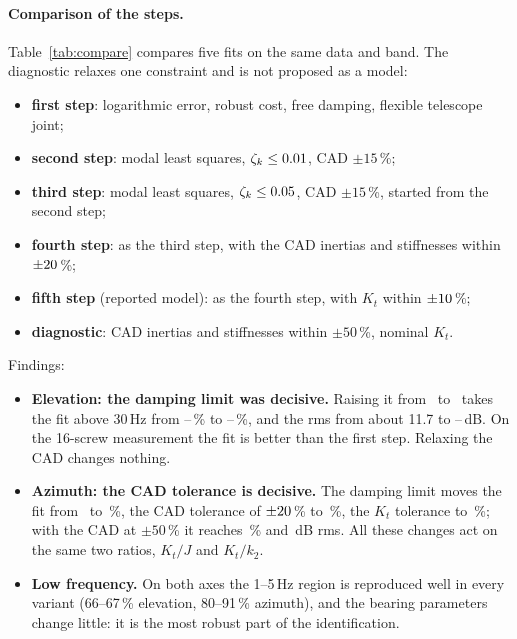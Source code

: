 \documentclass[10pt,a4paper]{article}
\numberwithin{equation}{section}
\begin{document}
\paragraph{Comparison of the steps.} Table~\ref{tab:compare} compares five fits on the same data and band. The diagnostic relaxes one constraint and is not proposed as a model:
\begin{itemize}
\item \textbf{first step}: logarithmic error, robust cost, free damping, flexible telescope joint;
\item \textbf{second step}: modal least squares, $\zeta_k\leq0.01$, CAD $\pm15$\,\%;
\item \textbf{third step}: modal least squares, $\zeta_k\leq0.05$, CAD $\pm15$\,\%, started from the second step;
\item \textbf{fourth step}: as the third step, with the CAD inertias and stiffnesses within $\pm20$\,\%;
\item \textbf{fifth step} (reported model): as the fourth step, with $K_t$ within $\pm10$\,\%;
\item \textbf{diagnostic}: CAD inertias and stiffnesses within $\pm50$\,\%, nominal $K_t$.
\end{itemize}
Findings:
\begin{itemize}
\item \textbf{Elevation: the damping limit was decisive.} Raising it from \zetaMaxStep\ to \zetaMax\ takes the fit above 30\,Hz from \fitPIIStep--\fitPIIIStep\,\% to \fitPIII--\fitPII\,\%, and the rms from about 11.7 to \dbPIII--\dbPII\,dB. On the 16-screw measurement the fit is better than the first step. Relaxing the CAD changes nothing.
\item \textbf{Azimuth: the CAD tolerance is decisive.} The damping limit moves the fit from \fitAStep\ to \fitAStepJ\,\%, the CAD tolerance of $\pm20$\,\% to \fitAFour\,\%, the $K_t$ tolerance to \fitA\,\%; with the CAD at $\pm50$\,\% it reaches \fitACad\,\% and \dbACad\,dB rms. All these changes act on the same two ratios, $K_t/J$ and $K_t/k_2$.
\item \textbf{Low frequency.} On both axes the 1--5\,Hz region is reproduced well in every variant (66--67\,\% elevation, 80--91\,\% azimuth), and the bearing parameters change little: it is the most robust part of the identification.
\end{itemize}
\end{document}
